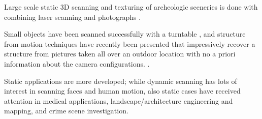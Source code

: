 Large scale static 3D scanning and texturing of archeologic sceneries is done with combining laser scanning and photographs \cite{lerma2010terrestrial}.

Small objects have been scanned successfully with a turntable \cite{fitzgibbon1998automatic}, and structure from motion techniques have recently been presented that impressively recover a structure from pictures taken all over an outdoor location with no a priori information about the camera configurations. \cite{goesele2007multi,furukawa2010towards}.

Static applications are more developed; while dynamic scanning has lots of interest in scanning faces and human motion, also static cases have received attention in medical applications, landscape/architecture engineering and mapping, and crime scene investigation.
